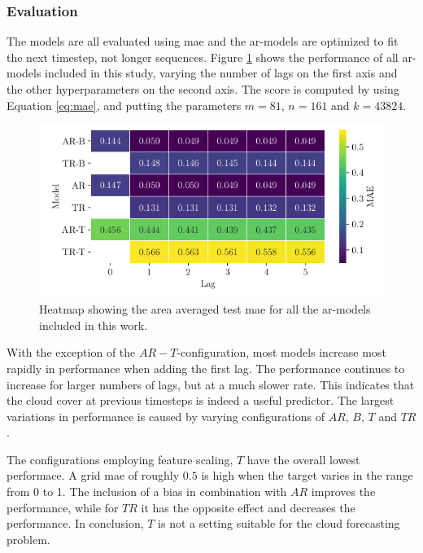 \subsubsection{Evaluation}
The models are all evaluated using \acrfull{mae} and the \acrshort{ar}-models are optimized to fit the next timestep, not longer sequences. Figure \ref{fig:heatmap_ar_models} shows the performance of all \acrshort{ar}-models included in this study, varying the number of lags on the first axis and the other hyperparameters on the second axis. The score is computed by using Equation \eqref{eq:mae}, and putting the parameters $m = 81$, $n=161$ and $k=43824$. 
\begin{figure}
    \centering
    \includegraphics{python_figs/heat_ar_model_mae_test_score.png}
    \caption{Heatmap showing the area averaged test \acrshort{mae} for all the \acrshort{ar}-models included in this work. }
    \label{fig:heatmap_ar_models}
\end{figure}
With the exception of the $AR-T$-configuration, most models increase most rapidly in performance when adding the first lag. The performance continues to increase for larger numbers of lags, but at a much slower rate. This indicates that the cloud cover at previous timesteps is indeed a useful predictor. The largest variations in performance is caused by varying configurations of $AR$, $B$, $T$ and $TR$. 

The configurations employing feature scaling, $T$ have the overall lowest performace. A grid \acrshort{mae} of roughly $0.5$ is high when the target varies in the range from 0 to 1. The inclusion of a bias in combination with $AR$ improves the performance, while for $TR$ it has the opposite effect and decreases the performance. In conclusion, $T$ is not a setting suitable for the cloud forecasting problem.

